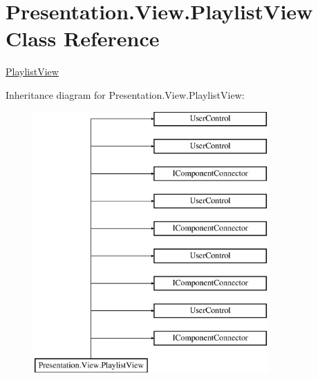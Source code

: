 \hypertarget{class_presentation_1_1_view_1_1_playlist_view}{}\section{Presentation.\+View.\+Playlist\+View Class Reference}
\label{class_presentation_1_1_view_1_1_playlist_view}


\hyperlink{class_presentation_1_1_view_1_1_playlist_view}{Playlist\+View}  


Inheritance diagram for Presentation.\+View.\+Playlist\+View\+:\begin{figure}[H]
\begin{center}
\leavevmode
\includegraphics[height=10.000000cm]{class_presentation_1_1_view_1_1_playlist_view}
\end{center}
\end{figure}
